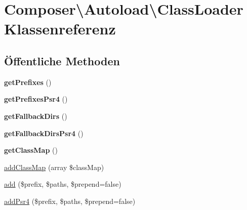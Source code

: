 \hypertarget{class_composer_1_1_autoload_1_1_class_loader}{}\section{Composer\textbackslash{}Autoload\textbackslash{}Class\+Loader Klassenreferenz}
\label{class_composer_1_1_autoload_1_1_class_loader}
\subsection*{Öffentliche Methoden}
\begin{DoxyCompactItemize}
\item 
\mbox{\label{class_composer_1_1_autoload_1_1_class_loader_af3d914a2e97ec1118f3d70e5a0ce6435}} 
{\bfseries get\+Prefixes} ()
\item 
\mbox{\label{class_composer_1_1_autoload_1_1_class_loader_a36833139effe6653454d8f02ea8f555b}} 
{\bfseries get\+Prefixes\+Psr4} ()
\item 
\mbox{\label{class_composer_1_1_autoload_1_1_class_loader_a9fe425ce19f8e1298cefbf5094b3c402}} 
{\bfseries get\+Fallback\+Dirs} ()
\item 
\mbox{\label{class_composer_1_1_autoload_1_1_class_loader_a149bf4470ee7c50bd6b9a84b6aa4bccd}} 
{\bfseries get\+Fallback\+Dirs\+Psr4} ()
\item 
\mbox{\label{class_composer_1_1_autoload_1_1_class_loader_aa7d3012e1f8299ecc6c3ff3cb3f2652e}} 
{\bfseries get\+Class\+Map} ()
\item 
\mbox{\hyperlink{class_composer_1_1_autoload_1_1_class_loader_a246d6f628e6ae99bf0ce65b0212f833a}{add\+Class\+Map}} (array \$class\+Map)
\item 
\mbox{\hyperlink{class_composer_1_1_autoload_1_1_class_loader_aa99f46d61bdf20b924a1bb08bfcb90bd}{add}} (\$prefix, \$paths, \$prepend=false)
\item 
\mbox{\hyperlink{class_composer_1_1_autoload_1_1_class_loader_a8831c0a7bb01fa44b4cb7a72ec111cf1}{add\+Psr4}} (\$prefix, \$paths, \$prepend=false)

\end{DoxyCompactItemize}
